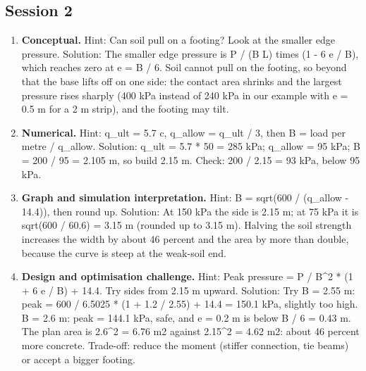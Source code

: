 \documentclass[11pt,a4paper]{article}
\begin{document}
\subsection*{Session 2}
\begin{enumerate}[nosep]
\item \textbf{Conceptual.} Hint: Can soil pull on a footing? Look at the smaller edge pressure. Solution: The smaller edge pressure is P / (B L) times (1 - 6 e / B), which reaches zero at e = B / 6. Soil cannot pull on the footing, so beyond that the base lifts off on one side: the contact area shrinks and the largest pressure rises sharply (400 kPa instead of 240 kPa in our example with e = 0.5 m for a 2 m strip), and the footing may tilt.
\item \textbf{Numerical.} Hint: q\_ult = 5.7 c, q\_allow = q\_ult / 3, then B = load per metre / q\_allow. Solution: q\_ult = 5.7 * 50 = 285 kPa; q\_allow = 95 kPa; B = 200 / 95 = 2.105 m, so build 2.15 m. Check: 200 / 2.15 = 93 kPa, below 95 kPa.
\item \textbf{Graph and simulation interpretation.} Hint: B = sqrt(600 / (q\_allow - 14.4)), then round up. Solution: At 150 kPa the side is 2.15 m; at 75 kPa it is sqrt(600 / 60.6) = 3.15 m (rounded up to 3.15 m). Halving the soil strength increases the width by about 46 percent and the area by more than double, because the curve is steep at the weak-soil end.
\item \textbf{Design and optimisation challenge.} Hint: Peak pressure = P / B\textasciicircum{}2 * (1 + 6 e / B) + 14.4. Try sides from 2.15 m upward. Solution: Try B = 2.55 m: peak = 600 / 6.5025 * (1 + 1.2 / 2.55) + 14.4 = 150.1 kPa, slightly too high. B = 2.6 m: peak = 144.1 kPa, safe, and e = 0.2 m is below B / 6 = 0.43 m. The plan area is 2.6\textasciicircum{}2 = 6.76 m2 against 2.15\textasciicircum{}2 = 4.62 m2: about 46 percent more concrete. Trade-off: reduce the moment (stiffer connection, tie beams) or accept a bigger footing.
\end{enumerate}
\end{document}

